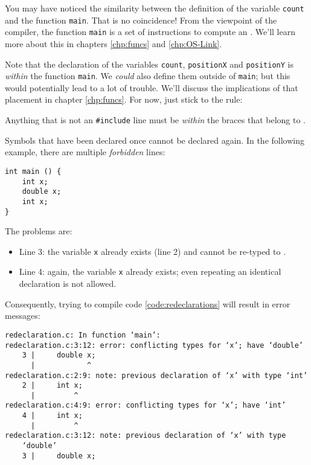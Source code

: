 You may have noticed the similarity between the definition of the variable \texttt{count} and the function \texttt{main}. That is no coincidence! From the viewpoint of the compiler, the function \texttt{main} is a set of instructions to compute an . We'll learn more about this in chapters \ref{chp:funcs} and \ref{chp:OS-Link}.

\begin{warnbox}
Note that the declaration of the variables \texttt{count}, \texttt{positionX} and \texttt{positionY} is \emph{within} the function \texttt{main}. We \emph{could} also define them outside of \texttt{main}; but this would potentially lead to a lot of trouble. We'll discuss the implications of that placement in chapter \ref{chp:funcs}. For now, just stick to the rule:

Anything that is not an \texttt{\#include} line must be \emph{within} the braces that belong to .
\end{warnbox}

\begin{warnbox}
Symbols that have been declared once cannot be declared again. In the following example, there are multiple \emph{forbidden} lines:
\begin{codebox}[redeclaration.c]
\begin{verbatim}
int main () {
    int x;
    double x;
    int x;
}
\end{verbatim}
 \label{code:redeclarations}
\end{codebox}
The problems are:
\begin{itemize}
\item Line 3: the variable \texttt{x} already exists (line 2) and cannot be re-typed to .
\item Line 4: again, the variable \texttt{x} already exists; even repeating an identical declaration is not allowed.
\end{itemize}

Consequently, trying to compile code \ref{code:redeclarations} will result in error messages:
\begin{cmdbox}
\begin{verbatim}
redeclaration.c: In function ‘main’:
redeclaration.c:3:12: error: conflicting types for ‘x’; have ‘double’
    3 |     double x;
      |            ^
redeclaration.c:2:9: note: previous declaration of ‘x’ with type ‘int’
    2 |     int x;
      |         ^
redeclaration.c:4:9: error: conflicting types for ‘x’; have ‘int’
    4 |     int x;
      |         ^
redeclaration.c:3:12: note: previous declaration of ‘x’ with type
    ‘double’
    3 |     double x;
\end{verbatim}
\end{cmdbox}
\end{warnbox}

